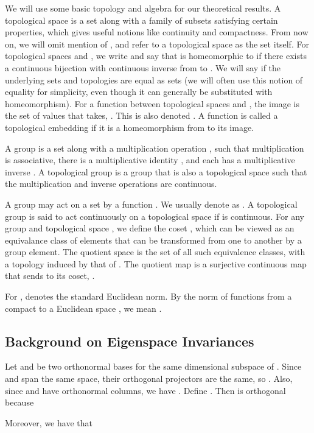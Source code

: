 \documentclass{article} \usepackage{iclr2023_conference,times}
\begin{document}
We will use some basic topology and algebra for our theoretical results. A topological space  is a set  along with a family of subsets  satisfying certain properties, which gives useful notions like continuity and compactness. From now on, we will omit mention of , and refer to a topological space as the set  itself. For topological spaces  and , we write  and say that  is homeomorphic to  if there exists a continuous bijection with continuous inverse from  to . We will say  if the underlying sets and topologies are equal as sets (we will often use this notion of equality for simplicity, even though it can generally be substituted with homeomorphism). 
For a function  between topological spaces  and , the image  is the set of values that  takes, . This is also denoted .
A function  is called a topological embedding if it is a homeomorphism from  to its image.

A group  is a set along with a multiplication operation , such that multiplication is associative, there is a multiplicative identity , and each  has a multiplicative inverse . A topological group is a group that is also a topological space such that the multiplication and inverse operations are continuous.

A group  may act on a set  by a function . We usually denote  as . A topological group is said to act continuously on a topological space  if  is continuous. For any group  and topological space , we define the coset , which can be viewed as an equivalance class of elements that can be transformed from one to another by a group element. The quotient space  is the set of all such equivalence classes, with a topology induced by that of . The quotient map  is a surjective continuous map that sends  to its coset, .

For ,  denotes the standard Euclidean norm. By the  norm of functions  from a compact  to a Euclidean space , we mean .

\subsection{Background on Eigenspace Invariances}\label{appendix:eigenspace_background}

 Let  and  be two orthonormal bases for the same  dimensional subspace of . Since  and  span the same space, their orthogonal projectors are the same, so . Also, since  and  have orthonormal columns, we have . Define . Then  is orthogonal because
 
 Moreover, we have that
 
\end{document}
